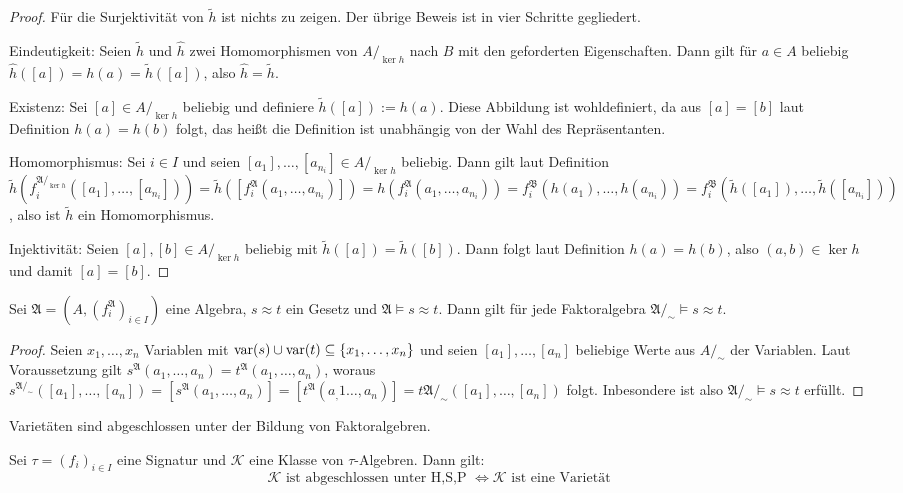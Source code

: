 \begin{proof}
    Für die Surjektivität von $\tilde{h}$ ist nichts zu zeigen. Der übrige Beweis ist in vier Schritte gegliedert.

    Eindeutigkeit: Seien $\tilde{h}$ und $\hat{h}$ zwei Homomorphismen von $A/_{\ker h}$ nach $B$ mit den geforderten Eigenschaften.
    Dann gilt für $a\in A$ beliebig $\hat{h}([a])=h(a)=\tilde{h}([a])$, also $\hat{h}=\tilde{h}$.

    Existenz: Sei $[a]\in A/_{\ker h}$ beliebig und definiere $\tilde{h}([a]):=h(a)$. Diese Abbildung ist wohldefiniert,
    da aus $[a]=[b]$ laut Definition $h(a)=h(b)$ folgt, das heißt die Definition ist unabhängig von der Wahl des Repräsentanten.

    Homomorphismus: Sei $i\in I$ und seien $[a_1],\ldots,[a_{n_i}]\in A/_{\ker h}$ beliebig. Dann gilt laut Definition
    $\tilde{h}(f^{\mathfrak{A}/_{\ker h}}_i([a_1],\ldots,[a_{n_i}]))=\tilde{h}([f^\mathfrak{A}_i(a_1,\ldots,a_{n_i})])=h(f^\mathfrak{A}_i(a_1,\ldots,a_{n_i}))=f^\mathfrak{B}_i(h(a_1),\ldots,h(a_{n_i}))=f^\mathfrak{B}_i(\tilde{h}([a_1]),\ldots,\tilde{h}([a_{n_i}]))$,
    also ist $\tilde{h}$ ein Homomorphismus.

    Injektivität: Seien $[a],[b]\in A/_{\ker h}$ beliebig mit $\tilde{h}([a])=\tilde{h}([b])$. Dann folgt laut Definition
    $h(a)=h(b)$, also $(a,b)\in\ker h$ und damit $[a]=[b]$.
\end{proof}

\begin{proposition}
    Sei $\mathfrak{A}=(A,(f^\mathfrak{A}_i)_{i\in I})$ eine Algebra, $s\approx t$ ein Gesetz und $\mathfrak{A}\models s\approx t$.
    Dann gilt für jede Faktoralgebra $\mathfrak{A}/_\sim\models s\approx t$.
\end{proposition}

\begin{proof}
    Seien $x_1,\ldots,x_n$ Variablen mit $\operatorname{var}(s)\cup\operatorname{var}(t)\subseteq\{x_1,\ldots,x_n\}$ und seien
    $[a_1],\ldots,[a_n]$ beliebige Werte aus $A/_\sim$ der Variablen. Laut Voraussetzung gilt $s^\mathfrak{A}(a_1,\ldots,a_n)=t^\mathfrak{A}(a_1,\ldots,a_n)$, woraus
    $s^{\mathfrak{A}/_\sim}([a_1],\ldots,[a_n])=[s^\mathfrak{A}(a_1,\ldots,a_n)]=[t^\mathfrak{A}(a_,1\ldots,a_n)]=t{\mathfrak{A}/_\sim}([a_1],\ldots,[a_n])$ folgt.
    Inbesondere ist also $\mathfrak{A}/_\sim\models s\approx t$ erfüllt.
\end{proof}

\begin{corollary}
    Varietäten sind abgeschlossen unter der Bildung von Faktoralgebren.
\end{corollary}

\begin{theorem}[Birkhoff]
    Sei $\tau=(f_i)_{i\in I}$ eine Signatur und $\mathcal{K}$ eine Klasse von $\tau$-Algebren. Dann gilt:
    \[\mathcal{K} \text{ ist abgeschlossen unter H,S,P } \Leftrightarrow \mathcal{K} \text{ ist eine Varietät} \]
\end{theorem}

